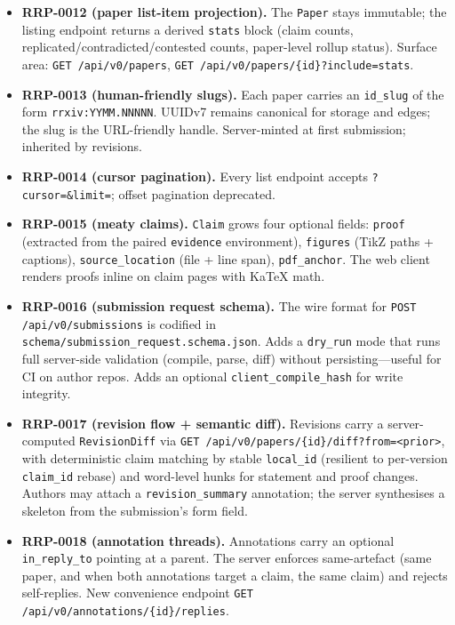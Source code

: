 \documentclass[11pt]{rrxiv}
\begin{document}
\begin{itemize}[leftmargin=*,itemsep=2pt]
  \item \textbf{RRP-0012 (paper list-item projection).} The \texttt{Paper} stays immutable; the listing endpoint returns a derived \texttt{stats} block (claim counts, replicated/contradicted/contested counts, paper-level rollup status). Surface area: \texttt{GET /api/v0/papers}, \texttt{GET /api/v0/papers/\{id\}?include=stats}.
  \item \textbf{RRP-0013 (human-friendly slugs).} Each paper carries an \texttt{id\_slug} of the form \texttt{rrxiv:YYMM.NNNNN}. UUIDv7 remains canonical for storage and edges; the slug is the URL-friendly handle. Server-minted at first submission; inherited by revisions.
  \item \textbf{RRP-0014 (cursor pagination).} Every list endpoint accepts \texttt{?cursor=\&limit=}; offset pagination deprecated.
  \item \textbf{RRP-0015 (meaty claims).} \texttt{Claim} grows four optional fields: \texttt{proof} (extracted from the paired \texttt{evidence} environment), \texttt{figures} (TikZ paths + captions), \texttt{source\_location} (file + line span), \texttt{pdf\_anchor}. The web client renders proofs inline on claim pages with KaTeX math.
  \item \textbf{RRP-0016 (submission request schema).} The wire format for \texttt{POST /api/v0/submissions} is codified in \texttt{schema/submission\_request.schema.json}. Adds a \texttt{dry\_run} mode that runs full server-side validation (compile, parse, diff) without persisting---useful for CI on author repos. Adds an optional \texttt{client\_compile\_hash} for write integrity.
  \item \textbf{RRP-0017 (revision flow + semantic diff).} Revisions carry a server-computed \texttt{RevisionDiff} via \texttt{GET /api/v0/papers/\{id\}/diff?from=<prior>}, with deterministic claim matching by stable \texttt{local\_id} (resilient to per-version \texttt{claim\_id} rebase) and word-level hunks for statement and proof changes. Authors may attach a \texttt{revision\_summary} annotation; the server synthesises a skeleton from the submission's form field.
  \item \textbf{RRP-0018 (annotation threads).} Annotations carry an optional \texttt{in\_reply\_to} pointing at a parent. The server enforces same-artefact (same paper, and when both annotations target a claim, the same claim) and rejects self-replies. New convenience endpoint \texttt{GET /api/v0/annotations/\{id\}/replies}.

\end{itemize}
\end{document}
